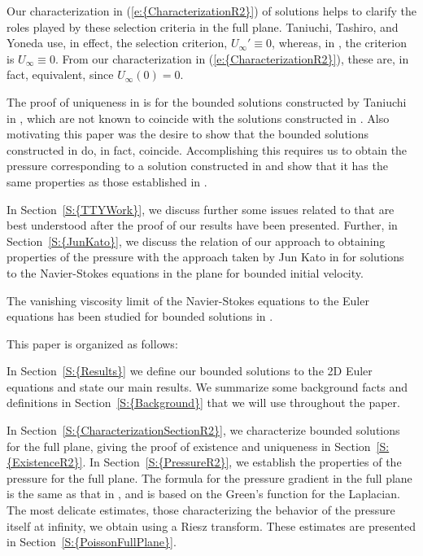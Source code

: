 \documentclass[reqno,openright,11pt,twoside]{amsart}
\theoremstyle{definition}
\numberwithin{equation}{section}
\begin{document}
Our characterization in {(\ref{e:{CharacterizationR2}})} of solutions helps to clarify the roles played by these selection criteria in the full plane. Taniuchi, Tashiro, and Yoneda use, in effect, the selection criterion, $U_{\ensuremath{\infty}}' \equiv 0$, whereas, in \cite{AKLL2014}, the criterion is $U_{\ensuremath{\infty}} \equiv 0$. From our characterization in {(\ref{e:{CharacterizationR2}})}, these are, in fact, equivalent, since $U_{\ensuremath{\infty}}(0) = 0$.

The proof of uniqueness in \cite{TaniuchiEtAl2010} is for the bounded solutions constructed by Taniuchi in \cite{Taniuchi2004}, which are not known to coincide with the solutions constructed in \cite{Serfati1995A, AKLL2014}. Also motivating this paper was the desire to show that the bounded solutions constructed in \cite{Serfati1995A, Taniuchi2004, AKLL2014} do, in fact, coincide. Accomplishing this requires us to obtain the pressure corresponding to a solution constructed in \cite{AKLL2014} and show that it has the same properties as those established in \cite{Taniuchi2004}.

In {Section~\ref{S:{TTYWork}}}, we discuss further some issues related to \cite{Taniuchi2004, TaniuchiEtAl2010} that are best understood after the proof of our results have been presented. Further, in {Section~\ref{S:{JunKato}}}, we discuss the relation of our approach to obtaining properties of the pressure with the approach taken by Jun Kato in \cite{JunKato2003} for solutions to the Navier-Stokes equations in the plane for bounded initial velocity.
 
The vanishing viscosity limit of the Navier-Stokes equations to the Euler equations has been studied for bounded solutions in \cite{Cozzi2009, Cozzi2010, Cozzi2013}.

\bigskip

This paper is organized as follows:

In {Section~\ref{S:{Results}}} we define our bounded solutions to the 2D Euler equations and state our main results. We summarize some background facts and definitions in {Section~\ref{S:{Background}}} that we will use throughout the paper.

In {Section~\ref{S:{CharacterizationSectionR2}}}, we characterize bounded solutions for the full plane, giving the proof of existence and uniqueness in {Section~\ref{S:{ExistenceR2}}}. In {Section~\ref{S:{PressureR2}}}, we establish the properties of the pressure for the full plane. The formula for the pressure gradient in the full plane is the same as that in \cite{Serfati1995B}, and is based on the Green's function for the Laplacian. The most delicate estimates, those characterizing the behavior of the pressure itself at infinity, we obtain using a Riesz transform. These estimates are presented in {Section~\ref{S:{PoissonFullPlane}}}.
\end{document}
